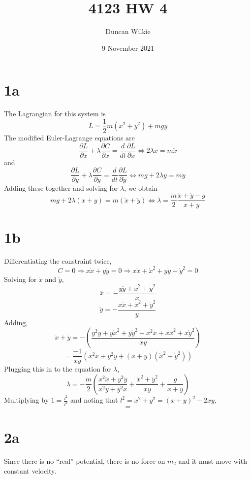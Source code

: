 \documentclass{article}
\title{4123 HW 4}
\author{Duncan Wilkie}
\date{9 November 2021}
\begin{document}
\maketitle

\section*{1a}
The Lagrangian for this system is
\[L=\frac{1}{2}m(\dot{x}^2+\dot{y}^2)+mgy\]
The modified Euler-Lagrange equations are
\[\frac{\partial L}{\partial x}+\lambda\frac{\partial C}{\partial x}=\frac{d}{dt}\frac{\partial L}{\partial \dot{x}}\Leftrightarrow 2\lambda x=m\ddot{x}\]
and
\[\frac{\partial L}{\partial y}+\lambda\frac{\partial C}{\partial y}=\frac{d}{dt}\frac{\partial L}{\partial\dot{y}}\Leftrightarrow mg+2\lambda y = m\ddot{y}\]
Adding these together and solving for $\lambda$, we obtain
\[mg+2\lambda(x+y)=m(\ddot{x}+\ddot{y})\Leftrightarrow \lambda = \frac{m}{2}\frac{\ddot{x}+\ddot{y}-g}{x+y}\]

\section*{1b}
Differentiating the constraint twice,
\[C=0\Rightarrow x\dot{x}+y\dot{y}=0\Rightarrow x\ddot{x}+\dot{x}^2+y\ddot{y}+\dot{y}^2=0\]
Solving for $\ddot{x}$ and $\ddot{y}$,
\[\ddot{x}=-\frac{y\ddot{y}+\dot{x}^2+\dot{y}^2}{x}\]
\[\ddot{y}=-\frac{x\ddot{x}+\dot{x}^2+\dot{y}^2}{y}\]
Adding,
\[\ddot{x}+\ddot{y}=-\left( \frac{y^2\ddot{y}+y\dot{x}^2+y\dot{y}^2+x^2\ddot{x}+x\dot{x}^2+x\dot{y}^2}{xy} \right)\]\[=\frac{-1}{xy}\left( x^2\ddot{x}+y^2\ddot{y}+(x+y)(\dot{x}^2+\dot{y}^2) \right)\]
Plugging this in to the equation for $\lambda$,
\[\lambda = -\frac{m}{2}\left(  \frac{x^2\ddot{x}+y^2\ddot{y}}{x^2y+y^2x}+\frac{\dot{x}^2+\dot{y}^2}{xy} +\frac{g}{x+y}\right)\]
Multiplying by $1=\frac{l^2}{l^2}$ and noting that $l^2=x^2+y^2=(x+y)^2-2xy$,
\[=\]

\section*{2a}
Since there is no ``real'' potential, there is no force on $m_2$ and it must move with constant velocity. 
\end{document}
